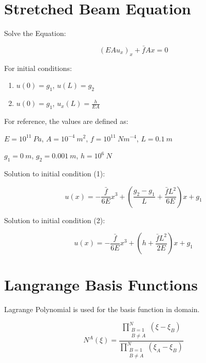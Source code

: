 \documentclass[letterpaper]{report}
\begin{document}
\chapter{Stretched Beam Equation}

Solve the Equation:

\begin{equation}
\left(EA u_x \right)_x + \bar{f}Ax = 0
\end{equation}

For initial conditions:

\begin{enumerate}
\item $u(0) = g_1$, $u(L) = g_2$
\item $u(0) = g_1$, $u_x(L) = \frac{h}{EA}$
\end{enumerate}

For reference, the values are defined as:

\vspace{0.3in}
$E = 10^{11}~Pa$, $A = 10^{-4}~m^2$, $f = 10^{11}~Nm^{-4}$, $L = 0.1~m$

$g_1 = 0~m$, $g_2 = 0.001~m$, $h = 10^6~N$

\vspace{0.3in}
Solution to initial condition (1):

\begin{equation}
u(x) = -\frac{\bar{f}}{6E} x^3 + \left( \frac{g_2-g_1}{L} + \frac{\bar{f}L^2}{6E} \right) x + g_1
\end{equation}

Solution to initial condition (2):

\begin{equation}
u(x) = -\frac{\bar{f}}{6E} x^3 + \left( h+\frac{\bar{f}L^2}{2E} \right) x + g_1
\end{equation}

\chapter{Langrange Basis Functions}

Lagrange Polynomial is used for the basis function in domain.

\begin{equation}
N^A(\xi) = \frac{\prod\limits_{\substack{B=1 \\ B\ne A}}^{N} (\xi-\xi_B)}{\prod\limits_{\substack{B=1 \\ B \ne A}}^{N} (\xi_A-\xi_B)}
\end{equation}
\end{document}
